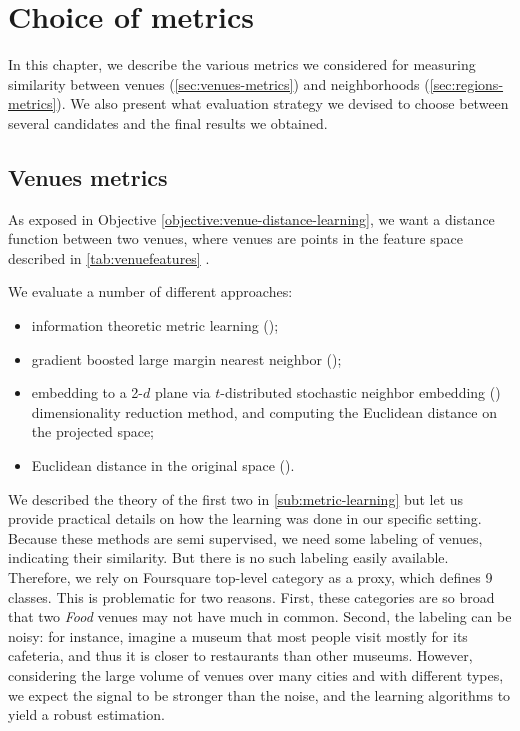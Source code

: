 \chapter{Choice of metrics}
\label{chap:metric}

In this chapter, we describe the various metrics we considered for measuring
similarity between venues (\autoref{sec:venues-metrics}) and neighborhoods
(\autoref{sec:regions-metrics}). We also present what evaluation strategy we
devised to choose between several candidates and the final results we obtained.

\section{Venues metrics}
\label{sec:venues-metrics}

As exposed in Objective \ref{objective:venue-distance-learning}, we want a
distance function between two venues, where venues are points in the feature
space described in \autoref{tab:venuefeatures} .

We evaluate a number of different approaches:
\begin{itemize}
	\item
		information theoretic metric learning (\itml);
	\item
		gradient boosted large margin nearest neighbor (\lmnn);
	\item
		embedding to a 2-$d$ plane via $t$-distributed stochastic neighbor
		embedding (\tsne) dimensionality reduction method, and computing the
		Euclidean distance on the projected space; 
	\item 
		Euclidean distance in the original space (\eucl).
\end{itemize}		

We described the theory of the first two in \autoref{sub:metric-learning} but
let us provide practical details on how the learning was done in our specific
setting. Because these methods are semi supervised, we need some labeling of
venues, indicating their similarity. But there is no such labeling easily
available. Therefore, we rely on Foursquare top-level category as a proxy,
which defines 9 classes. This is problematic for two reasons. First, these
categories are so broad that two \emph{Food} venues may not have much in
common. Second, the labeling can be noisy: for instance, imagine a museum that
most people visit mostly for its cafeteria, and thus it is closer to
restaurants than other museums.  However, considering the large volume of
venues over many cities and with different types, we expect the signal to be
stronger than the noise, and the learning algorithms to yield a robust
estimation. 

